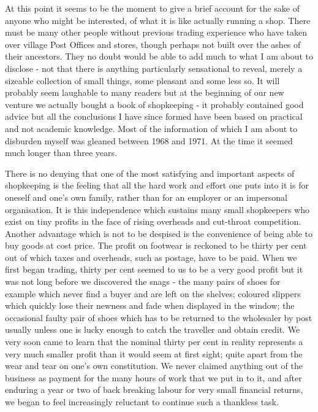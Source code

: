 
At this point it seems to be the moment to give a brief account for the sake of anyone who might be interested, of what it is like actually running a shop. There must be many other people without previous trading experience who have taken over village Post Offices and stores, though perhaps not built over the ashes of their ancestors. They no doubt would be able to add much to what I am about to disclose - not that there is anything particularly sensational to reveal, merely a sizeable collection of small things, some pleasant and some less so. It will probably seem laughable to many readers but at the beginning of our new venture we actually bought a  book of shopkeeping - it probably contained good advice but all the conclusions I have since formed have been based on practical and not academic knowledge. Most of the information of which I am about to disburden myself was gleaned between 1968 and 1971. At the time it seemed much longer than three years.

There is no denying that one of the most satisfying and important aspects of shopkeeping is the feeling that all the hard work and effort one puts into it is for oneself and one's own family, rather than for an employer or an impersonal organisation. It is this independence which sustains many small shopkeepers who exist on tiny profits in the face of rising overheads and cut-throat competition. Another advantage which is not to be despised is the convenience of being able to buy goods at cost price. The profit on footwear is reckoned to be thirty per cent out of which taxes and overheads, such as postage, have to be paid. When we first began trading, thirty per cent seemed to us to be a very good profit but it was not long before we discovered the snags - the many pairs of shoes for example which never find a buyer and are left on the shelves; coloured slippers which quickly lose their newness and fade when displayed in the window; the occasional faulty pair of shoes which has to be returned to the wholesaler by post usually unless one is lucky enough to catch the traveller and obtain credit. We very soon came to learn that the nominal thirty per cent in reality represents a very much smaller profit than it would seem at first sight; quite apart from the wear and tear on one’s own constitution. We never claimed anything out of the business as payment for the many hours of work that we put in to it, and after enduring a year or two of back breaking labour for very small financial returns, we began to feel increasingly reluctant to continue such a thankless task.

